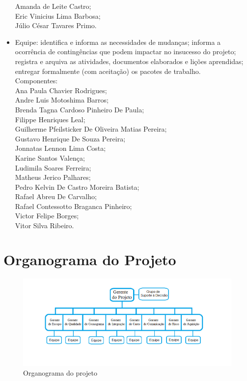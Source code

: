 \begin{itemize}
  Amanda de Leite Castro;\\
  Eric Vinicius Lima Barbosa;\\
  Júlio César Tavares Primo.\\
  \item Equipe: identifica e informa as necessidades de mudanças; informa a ocorrência de contingências que podem impactar no insucesso do projeto; registra e arquiva as atividades, documentos elaborados e lições aprendidas; entregar formalmente (com aceitação) os pacotes de trabalho.\\
Componentes:\\
Ana Paula Chavier Rodrigues;\\
Andre Luis Motoshima Barros;\\
Brenda Tagna Cardoso Pinheiro De Paula;\\
Filippe Henriques Leal;\\
Guilherme Pfeilsticker De Oliveira Matias Pereira;\\
Gustavo Henrique De Souza Pereira;\\
Jonnatas Lennon Lima Costa;\\
Karine Santos Valença;\\
Ludimila Soares Ferreira;\\
Matheus Jerico Palhares;\\
Pedro Kelvin De Castro Moreira Batista;\\
Rafael Abreu De Carvalho;\\
Rafael Contessotto Braganca Pinheiro;\\
Victor Felipe Borges;\\
Vitor Silva Ribeiro.\\
  \end{itemize}
\newpage
\section*{Organograma do Projeto}
  \begin{figure}[!ht]
\centering
\includegraphics[scale=0.6]{editaveis/figuras/Organograma}
\caption{Organograma do projeto}
\label{Organograma}
\end{figure}

